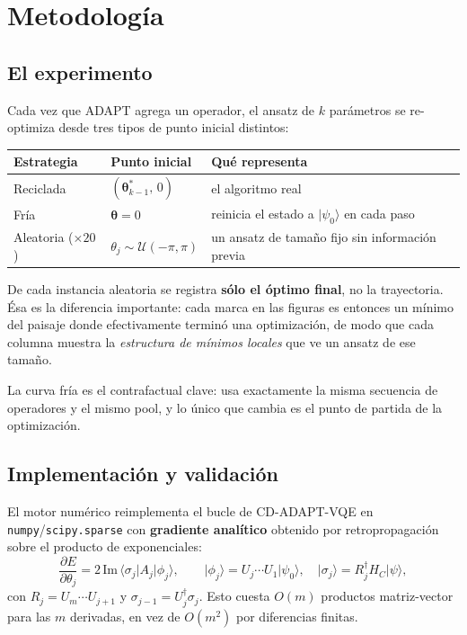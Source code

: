 \documentclass[11pt,a4paper]{article}
\newcommand{\ket}[1]{\lvert #1 \rangle}
\newcommand{\bra}[1]{\langle #1 \rvert}
\begin{document}
\section{Metodología}

\subsection{El experimento}

Cada vez que ADAPT agrega un operador, el ansatz de $k$ parámetros se
re-optimiza desde tres tipos de punto inicial distintos:

\begin{center}
\begin{tabular}{lll}
\toprule
Estrategia & Punto inicial & Qué representa \\
\midrule
Reciclada & $(\boldsymbol\theta^*_{k-1},\, 0)$ & el algoritmo real \\
Fría & $\boldsymbol\theta = 0$ & reinicia el estado a $\ket{\psi_0}$ en cada paso \\
Aleatoria ($\times 20$) & $\theta_j \sim \mathcal U(-\pi,\pi)$ & un ansatz de tamaño fijo sin información previa \\
\bottomrule
\end{tabular}
\end{center}

De cada instancia aleatoria se registra \textbf{sólo el óptimo final}, no la
trayectoria. Ésa es la diferencia importante: cada marca en las figuras es
entonces un mínimo del paisaje donde efectivamente terminó una optimización, de
modo que cada columna muestra la \emph{estructura de mínimos locales} que ve un
ansatz de ese tamaño.

La curva fría es el contrafactual clave: usa exactamente la misma secuencia de
operadores y el mismo pool, y lo único que cambia es el punto de partida de la
optimización.

\subsection{Implementación y validación}

El motor numérico reimplementa el bucle de CD-ADAPT-VQE en
\texttt{numpy}/\texttt{scipy.sparse} con \textbf{gradiente analítico} obtenido
por retropropagación sobre el producto de exponenciales:
\begin{equation}
\frac{\partial E}{\partial\theta_j} = 2\,\mathrm{Im}\,\bra{\sigma_j} A_j \ket{\phi_j},
\qquad
\ket{\phi_j} = U_j\cdots U_1\ket{\psi_0},\quad
\ket{\sigma_j} = R_j^\dagger H_C\ket{\psi},
\end{equation}
con $R_j = U_m\cdots U_{j+1}$ y $\sigma_{j-1} = U_j^\dagger\sigma_j$. Esto
cuesta $O(m)$ productos matriz-vector para las $m$ derivadas, en vez de
$O(m^2)$ por diferencias finitas.
\end{document}
